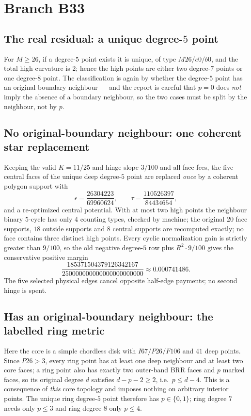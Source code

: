\section{Branch B33}

\subsection{The real residual: a unique degree-$5$ point}

For $M\ge26$, if a degree-$5$ point exists it is unique, of type $M26/e0/b0$, and the total high
curvature is $2$; hence the high points are either two degree-$7$ points or one degree-$8$ point.
The classification is again by whether the degree-$5$ point has an original boundary neighbour ---
and the report is careful that $p=0$ does \emph{not} imply the absence of a boundary neighbour, so
the two cases must be split by the neighbour, not by $p$.

\subsection{No original-boundary neighbour: one coherent star replacement}

Keeping the valid $K=11/25$ and hinge slope $3/100$ and all face fees, the five central faces of the
unique deep degree-$5$ point are replaced \emph{once} by a coherent polygon support with
\[
\epsilon=\frac{26304223}{69960624},\qquad \tau=\frac{110526397}{84434654},
\]
and a re-optimized central potential. With at most two high points the neighbour binary $5$-cycle
has only $4$ counting types, checked by machine; the original $20$ face supports, $18$ outside
supports and $8$ central supports are recomputed exactly; no face contains three distinct high
points. Every cyclic normalization gain is strictly greater than $9/100$, so the old negative
degree-$5$ row plus $R^2\cdot9/100$ gives the conservative positive margin
\[
\frac{185371504379126342167}{250000000000000000000000}\approx0.000741486 .
\]
The five selected physical edges cancel opposite half-edge payments; no second hinge is spent.

\subsection{Has an original-boundary neighbour: the labelled ring metric}

Here the core is a simple chordless disk with $I67/P26/F106$ and $41$ deep points. Since
$P26>3$, every ring point has at least one deep neighbour and at least two core faces; a ring point
also has exactly two outer-band BRR faces and $p$ marked faces, so its original degree $d$ satisfies
$d-p-2\ge2$, i.e.\ $p\le d-4$. This is a consequence of \emph{this} core topology and imposes
nothing on arbitrary interior points. The unique ring degree-$5$ point therefore has $p\in\{0,1\}$;
ring degree $7$ needs only $p\le3$ and ring degree $8$ only $p\le4$.

